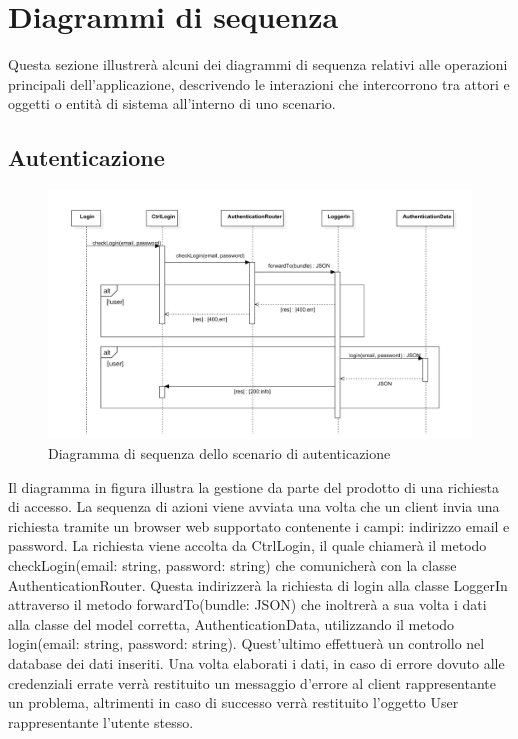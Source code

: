 \documentclass[a4paper, titlepage]{article}
\begin{document}
\newpage
\section{Diagrammi di sequenza}
Questa sezione illustrerà alcuni dei diagrammi di sequenza relativi alle operazioni principali
dell'applicazione, descrivendo le interazioni che intercorrono tra attori e oggetti o entità di
sistema all'interno di uno scenario.

\subsection{Autenticazione}
\begin{figure}[!h]
	\centering
	\includegraphics[scale=0.5]{Img/seq-login.pdf}
	\caption{Diagramma di sequenza dello scenario di autenticazione}
\end{figure}
Il diagramma in figura illustra la gestione da parte del prodotto di una richiesta di accesso. La sequenza di azioni viene avviata una volta che un client invia una richiesta tramite un browser web supportato contenente i campi: indirizzo email e password.
La richiesta viene accolta da CtrlLogin, il quale chiamerà il metodo checkLogin(email: string, password: string) che comunicherà con la classe AuthenticationRouter. Questa indirizzerà la richiesta di login alla classe LoggerIn attraverso il metodo forwardTo(bundle: JSON) che inoltrerà a sua volta i dati alla classe del model corretta, AuthenticationData, utilizzando il metodo login(email: string, password: string). Quest'ultimo effettuerà un controllo nel database dei dati inseriti. Una volta elaborati i dati, in caso di errore dovuto alle credenziali errate verrà restituito un messaggio d'errore al client rappresentante un problema, altrimenti in caso di successo verrà restituito l'oggetto User rappresentante l'utente stesso.
\end{document}
